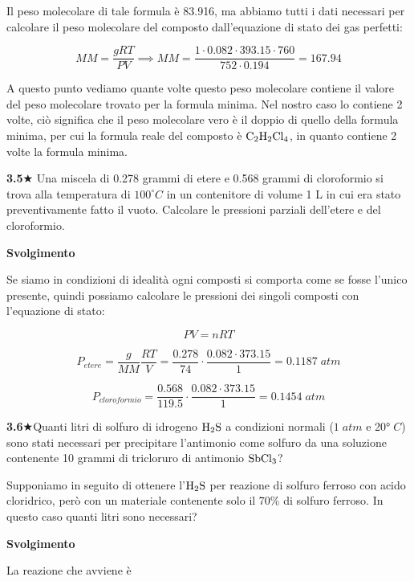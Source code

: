 Il peso molecolare di tale formula è 83.916, ma abbiamo tutti i dati necessari per calcolare il peso molecolare del composto dall'equazione di stato dei gas perfetti:

$$MM=\frac{gRT}{PV} \implies MM=\frac{1 \cdot 0.082 \cdot 393.15 \cdot 760}{752 \cdot 0.194}=167.94$$

A questo punto vediamo quante volte questo peso molecolare contiene il valore del peso molecolare trovato per la formula minima. Nel nostro caso lo contiene 2 volte, ciò significa che il peso molecolare vero è il doppio di quello della formula minima, per cui la formula reale del composto è $\rm C_2H_2Cl_4$, in quanto contiene 2 volte la formula minima.

\vspace{0.2cm}\textbf{3.5}$\bigstar$ Una miscela di 0.278 grammi di etere e 0.568 grammi di cloroformio si trova alla temperatura di $100^{\circ}C$ in un contenitore di volume 1 L in cui era stato preventivamente fatto il vuoto. Calcolare le pressioni parziali dell'etere e del cloroformio.

\vspace{0.2cm}\large\textbf{Svolgimento}\normalsize

\vspace{0.2cm}Se siamo in condizioni di idealità ogni composti si comporta come se fosse l'unico presente, quindi possiamo calcolare le pressioni dei singoli composti con l'equazione di stato:

$$PV=nRT$$

$$P_{etere}=\frac{g}{MM}\frac{RT}{V}=\frac{0.278}{74}\cdot\frac{0.082 \cdot 373.15}{1}=0.1187\;atm$$

$$P_{cloroformio}=\frac{0.568}{119.5}\cdot\frac{0.082 \cdot 373.15}{1}=0.1454\;atm$$

\vspace{0.2cm}\textbf{3.6}$\bigstar$Quanti litri di solfuro di idrogeno $\rm H_2S$ a condizioni normali ($1\;atm$ e 20°$\;C$) sono stati necessari per precipitare l'antimonio come solfuro da una soluzione contenente 10 grammi di tricloruro di antimonio $\rm SbCl_3$?

Supponiamo in seguito di ottenere l'$\rm H_2S$ per reazione di solfuro ferroso con acido cloridrico, però con un materiale contenente solo il 70\% di solfuro ferroso. In questo caso quanti litri sono necessari?

\vspace{0.2cm}\large\textbf{Svolgimento}\normalsize

\vspace{0.2cm}La reazione che avviene è

